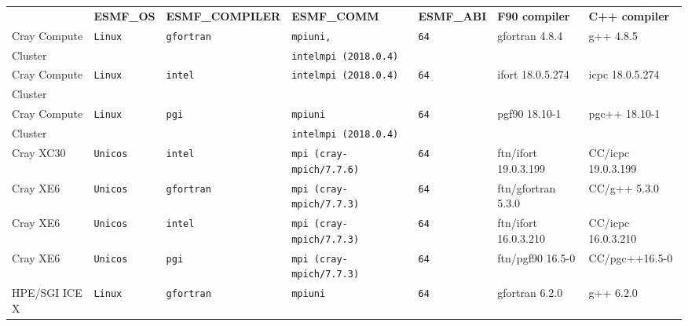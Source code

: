 \begin{longtable}{lllllll}
  &{\bfseries\footnotesize ESMF\_OS} &{\bfseries\footnotesize ESMF\_COMPILER} & {\bfseries\footnotesize ESMF\_COMM} & {\bfseries\footnotesize ESMF\_ABI} &
  {\bfseries\footnotesize F90 compiler} & {\bfseries\footnotesize C++ compiler} \\

Cray Compute   &\tt Linux  &\tt gfortran     &\tt mpiuni,            &\tt 64 & gfortran \footnotesize 4.8.4        & g++   \footnotesize 4.8.5         \\
Cluster        &           &                 &\tt intelmpi \footnotesize (2018.0.4)&       &                                     &                                   \\
Cray Compute   &\tt Linux  &\tt intel        &\tt intelmpi \footnotesize (2018.0.4)&\tt 64 & ifort    \footnotesize 18.0.5.274   & icpc  \footnotesize 18.0.5.274    \\
Cluster        &           &                 &                       &       &                                     &                                   \\
Cray Compute   &\tt Linux  &\tt pgi          &\tt mpiuni             &\tt 64 & pgf90    \footnotesize 18.10-1 	   & pgc++ \footnotesize 18.10-1       \\
Cluster        &           &                 &\tt intelmpi \footnotesize (2018.0.4)&       &                                     &                                   \\
Cray XC30      &\tt Unicos &\tt intel        &\tt mpi \footnotesize (cray-mpich/7.7.6) &\tt 64     & ftn/ifort \footnotesize 19.0.3.199  & CC/icpc \footnotesize 19.0.3.199  \\
Cray XE6       &\tt Unicos &\tt gfortran     &\tt mpi \footnotesize (cray-mpich/7.7.3) &\tt 64     & ftn/gfortran \footnotesize 5.3.0    & CC/g++  \footnotesize 5.3.0       \\
Cray XE6       &\tt Unicos &\tt intel        &\tt mpi \footnotesize (cray-mpich/7.7.3) &\tt 64     & ftn/ifort \footnotesize 16.0.3.210  & CC/icpc \footnotesize 16.0.3.210  \\
Cray XE6       &\tt Unicos &\tt pgi          &\tt mpi \footnotesize (cray-mpich/7.7.3) &\tt 64     & ftn/pgf90 \footnotesize 16.5-0      & CC/pgc++\footnotesize 16.5-0      \\
HPE/SGI ICE X  &\tt Linux  &\tt gfortran     &\tt mpiuni           &\tt 64           & gfortran \footnotesize 6.2.0        & g++ \footnotesize 6.2.0          \\

\end{longtable}
